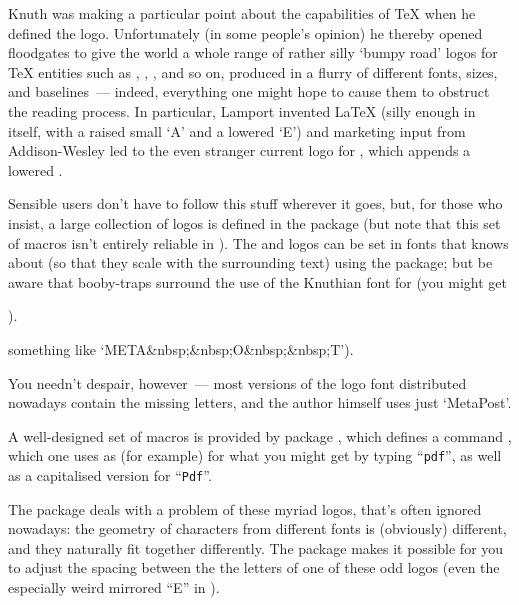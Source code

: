 
Knuth was making a particular point about the capabilities of \TeX{}
when he defined the logo.  Unfortunately (in some people's opinion) he thereby
opened floodgates to give the world a whole range of rather silly
`bumpy road' logos for \TeX{} entities such as \AMSTeX{}, \pictex{},
\BibTeX{}, and so on, produced in a flurry of different fonts, sizes,
and baselines~--- indeed, everything one might hope to cause them to
obstruct the reading process.  In particular, Lamport invented
\LaTeX{} (silly enough in itself, with a raised small `A' and a
lowered `E') and marketing input from Addison-Wesley led to the even
stranger current logo for \LaTeXe{}, which appends a lowered %
.

Sensible users don't have to follow this stuff wherever it goes,
but, for those who insist, a large collection of logos is defined in
the  package (but note that this set of macros isn't
entirely reliable in \LaTeXe{}).
The \MF{} and \MP{} logos can be set in fonts that \LaTeXe{}
knows about (so that they scale with the surrounding text) using the
 package; but be aware that booby-traps surround the
use of the Knuthian font for \MP{} (you might get
\begin{typesetversion}
  ).
\end{typesetversion}
\begin{htmlversion}
  something like `META\&nbsp;\&nbsp;O\&nbsp;\&nbsp;T').
\end{htmlversion}
You needn't despair, however~--- most versions of the logo font
distributed nowadays contain the missing letters, and the author
himself uses just `MetaPost'.

A well-designed set of macros is provided by package ,
which defines a command , which one uses as (for example)
 for what you might get by typing
``\texttt{pdf}'', as well as a capitalised version
 for ``\texttt{Pdf}''.

The package  deals with a problem of these myriad
logos, that's often ignored nowadays: the geometry of characters from
different fonts is (obviously) different, and they naturally fit
together differently.  The package makes it possible for you to adjust
the spacing between the the letters of one of these odd logos (even
the especially weird mirrored ``E'' in \xetex{}).

